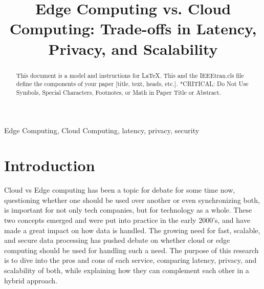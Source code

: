 \documentclass[conference]{IEEEtran}
\begin{document}
\title{Edge Computing vs. Cloud Computing: Trade-offs in Latency, Privacy, and Scalability 
}

\author{
\and

\and

\and

\and

}

\maketitle

\begin{abstract}
This document is a model and instructions for \LaTeX.
This and the IEEEtran.cls file define the components of your paper [title, text, heads, etc.]. *CRITICAL: Do Not Use Symbols, Special Characters, Footnotes, 
or Math in Paper Title or Abstract.
\end{abstract}

\begin{IEEEkeywords}
Edge Computing, Cloud Computing, latency, privacy, security
\end{IEEEkeywords}

\section{Introduction}

Cloud vs Edge computing has been a topic for debate for some time now, questioning whether one should be used over another or even synchronizing both, is important for not only tech companies, but for technology as a whole. These two concepts emerged and were put into practice in the early 2000’s, and have made a great impact on how data is handled. The growing need for fast, scalable, and secure data processing has pushed debate on whether cloud or edge computing should be used for handling such a need. The purpose of this research is to dive into the pros and cons of each service, comparing latency, privacy, and scalability of both, while explaining how they can complement each other in a hybrid approach. 
\end{document}
